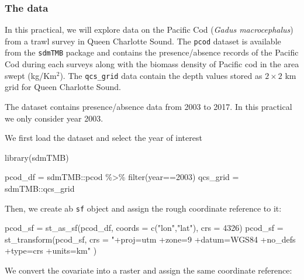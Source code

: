 \documentclass[
  letterpaper,
  DIV=11,
  numbers=noendperiod]{scrartcl}
\newenvironment{Shaded}{\begin{snugshade}}{\end{snugshade}}
\newcommand{\AttributeTok}[1]{\textcolor[rgb]{0.40,0.45,0.13}{#1}}
\newcommand{\DecValTok}[1]{\textcolor[rgb]{0.68,0.00,0.00}{#1}}
\newcommand{\FunctionTok}[1]{\textcolor[rgb]{0.28,0.35,0.67}{#1}}
\newcommand{\NormalTok}[1]{\textcolor[rgb]{0.00,0.23,0.31}{#1}}
\newcommand{\OtherTok}[1]{\textcolor[rgb]{0.00,0.23,0.31}{#1}}
\newcommand{\SpecialCharTok}[1]{\textcolor[rgb]{0.37,0.37,0.37}{#1}}
\newcommand{\StringTok}[1]{\textcolor[rgb]{0.13,0.47,0.30}{#1}}
\begin{document}
\subsubsection{The data}\label{the-data-1}

In this practical, we will explore data on the Pacific Cod (\emph{Gadus
macrocephalus}) from a trawl survey in Queen Charlotte Sound. The
\texttt{pcod} dataset is available from the \texttt{sdmTMB} package and
contains the presence/absence records of the Pacific Cod during each
surveys along with the biomass density of Pacific cod in the area swept
(kg/Km\(^2\)). The \texttt{qcs\_grid} data contain the depth values
stored as \(2\times 2\) km grid for Queen Charlotte Sound.

The dataset contains presence/absence data from 2003 to 2017. In this
practical we only consider year 2003.

We first load the dataset and select the year of interest

\begin{Shaded}
\begin{Highlighting}[]
\FunctionTok{library}\NormalTok{(sdmTMB)}

\NormalTok{pcod\_df }\OtherTok{=}\NormalTok{ sdmTMB}\SpecialCharTok{::}\NormalTok{pcod }\SpecialCharTok{\%\textgreater{}\%} \FunctionTok{filter}\NormalTok{(year}\SpecialCharTok{==}\DecValTok{2003}\NormalTok{)}
\NormalTok{qcs\_grid }\OtherTok{=}\NormalTok{ sdmTMB}\SpecialCharTok{::}\NormalTok{qcs\_grid}
\end{Highlighting}
\end{Shaded}

Then, we create ab \texttt{sf} object and assign the rough coordinate
reference to it:

\begin{Shaded}
\begin{Highlighting}[]
\NormalTok{pcod\_sf }\OtherTok{=}   \FunctionTok{st\_as\_sf}\NormalTok{(pcod\_df, }\AttributeTok{coords =} \FunctionTok{c}\NormalTok{(}\StringTok{"lon"}\NormalTok{,}\StringTok{"lat"}\NormalTok{), }\AttributeTok{crs =} \DecValTok{4326}\NormalTok{)}
\NormalTok{pcod\_sf }\OtherTok{=} \FunctionTok{st\_transform}\NormalTok{(pcod\_sf,}
                       \AttributeTok{crs =} \StringTok{"+proj=utm +zone=9 +datum=WGS84 +no\_defs +type=crs +units=km"}\NormalTok{ )}
\end{Highlighting}
\end{Shaded}

We convert the covariate into a raster and assign the same coordinate
reference:
\end{document}

